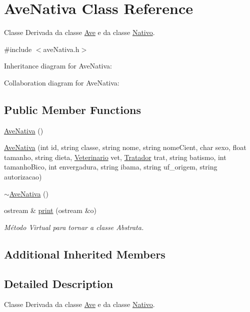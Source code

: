 \hypertarget{classAveNativa}{}\section{Ave\+Nativa Class Reference}
\label{classAveNativa}


Classe Derivada da classe \hyperlink{classAve}{Ave} e da classe \hyperlink{classNativo}{Nativo}.  




{\ttfamily \#include $<$ave\+Nativa.\+h$>$}



Inheritance diagram for Ave\+Nativa\+:


Collaboration diagram for Ave\+Nativa\+:
\subsection*{Public Member Functions}
\begin{DoxyCompactItemize}
\item 
\hyperlink{classAveNativa_ada67095a7449be106d239cfa8d0217ad}{Ave\+Nativa} ()
\item 
\hyperlink{classAveNativa_a303e2a0f6ce39e551c7b4a57508b8e69}{Ave\+Nativa} (int id, string classe, string nome, string nome\+Cient, char sexo, float tamanho, string dieta, \hyperlink{classVeterinario}{Veterinario} vet, \hyperlink{classTratador}{Tratador} trat, string batismo, int tamanho\+Bico, int envergadura, string ibama, string uf\+\_\+origem, string autorizacao)
\item 
\hyperlink{classAveNativa_a99f26c9e02d0714a29f595bd8ecfaf5b}{$\sim$\+Ave\+Nativa} ()
\item 
ostream \& \hyperlink{classAveNativa_a08a35d6ee2417ab7eebcdbf3b1d164ab}{print} (ostream \&o)
\begin{DoxyCompactList}\small\item\em Método Virtual para tornar a classe Abstrata. \end{DoxyCompactList}\end{DoxyCompactItemize}
\subsection*{Additional Inherited Members}


\subsection{Detailed Description}
Classe Derivada da classe \hyperlink{classAve}{Ave} e da classe \hyperlink{classNativo}{Nativo}. 


